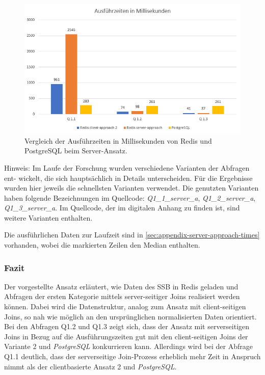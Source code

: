 \begin{figure}[ht]  %
    \centering      %
    \includegraphics[width=1\textwidth]{pictures/results/results-server.png}
    \caption{Vergleich der Ausführzeiten in Millisekunden von Redis und PostgreSQL beim Server-Ansatz.}      %
    \label{pic:results-server}    %
\end{figure}

Hinweis: Im Laufe der Forschung wurden verschiedene Varianten der Abfragen ent-
wickelt, die sich hauptsächlich in Details unterscheiden. Für die Ergebnisse wurden
hier jeweils die schnellsten Varianten verwendet. Die
genutzten Varianten haben folgende Bezeichnungen im Quellcode: \emph{Q1\_1\_server\_a}, \emph{Q1\_2\_server\_a}, \emph{Q1\_3\_server\_a}. Im Quellcode,
der im digitalen Anhang zu finden ist, sind weitere Varianten enthalten.


Die ausführlichen Daten zur Laufzeit sind in \cref{sec:appendix-server-approach-times} vorhanden, wobei die markierten Zeilen den Median enthalten.

\subsubsection{Fazit}
Der vorgestellte Ansatz erläutert, wie Daten des \ac{SSB} in Redis geladen und Abfragen der ersten Kategorie mittels server-seitiger Joins realisiert werden können. Dabei wird die Datenstruktur, analog zum Ansatz mit client-seitigen Joins, so nah wie möglich an den ursprünglichen normalisierten Daten orientiert. Bei den Abfragen Q1.2 und Q1.3 zeigt sich, dass der Ansatz mit serverseitigen Joins in Bezug auf die Ausführungszeiten gut mit den client-seitigen Joins der Variante 2 und \emph{PostgreSQL} konkurrieren kann. Allerdings wird bei der Abfrage Q1.1 deutlich, dass der serverseitige Join-Prozess erheblich mehr Zeit in Anspruch nimmt als der clientbasierte Ansatz 2 und \emph{PostgreSQL}.

